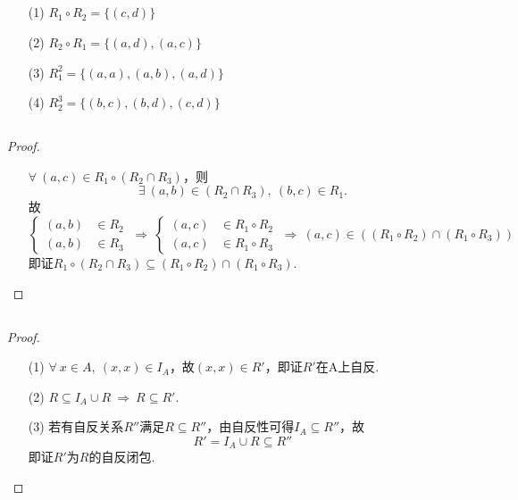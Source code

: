 \documentclass[UTF8]{ctexart}
\begin{document}
\subsection{}   %
\begin{enumerate}
    \item [(1)]$R_1 \circ R_2 = \{(c,d) \}$
    \item [(2)]$R_2 \circ R_1 = \{(a,d), (a,c)\}$
    \item [(3)]$R_1^2 = \{(a,a), (a,b), (a,d)\}$ 
    \item [(4)]$R_2^3 = \{(b,c), (b,d), (c,d)\}$
\end{enumerate}

\subsection{}   %
\begin{proof}
    \begin{enumerate}
        \item []
        \item []$\forall\ (a,c)\in R_1 \circ (R_2 \cap R_3)$，则
        \[
            \exists\ (a,b)\in (R_2 \cap R_3),\ (b,c)\in R_1 .    
        \]
        故
        \[
            \begin{cases}
                (a,b) & \in R_2 \\
                (a,b) & \in R_3
            \end{cases}    
            \ \Rightarrow\ 
            \begin{cases}
                (a,c) & \in R_1 \circ R_2\\
                (a,c) & \in R_1 \circ R_3
            \end{cases}
            \ \Rightarrow\ 
            (a,c)\in \left((R_1 \circ R_2) \cap (R_1 \circ R_3) \right)
        \]
        即证$R_1 \circ (R_2 \cap R_3) \subseteq (R_1 \circ R_2) \cap (R_1 \circ R_3)$.
    \end{enumerate}
\end{proof}

\subsection{}   %
\begin{proof}
    \begin{enumerate}
        \item []
        \item [(1)]$\forall\ x\in A,\ (x,x)\in I_A$，故$(x,x)\in R'$，即证$R'$在A上自反.
        \item [(2)]$R \subseteq I_A \cup R\ \Rightarrow\ R\subseteq R'$.
        \item [(3)]若有自反关系$R''$满足$R \subseteq R''$，由自反性可得$I_A \subseteq R''$，故
        \[
            R'=I_A \cup R \subseteq R''    
        \]
        即证$R'$为$R$的自反闭包.
    \end{enumerate}
\end{proof}
\end{document}
